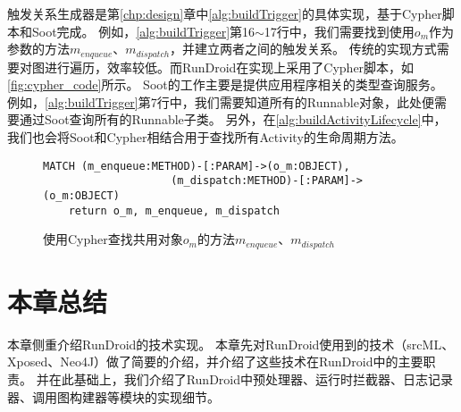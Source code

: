 触发关系生成器是第\ref{chp:design}章中\autoref{alg:buildTrigger}的具体实现，基于Cypher脚本和Soot完成。
例如，\autoref{alg:buildTrigger}第16$\sim$17行中，我们需要找到使用$o_{m}$作为参数的方法$m_{enqueue}$、$m_{dispatch}$，并建立两者之间的触发关系。
传统的实现方式需要对图进行遍历，效率较低。而RunDroid在实现上采用了Cypher脚本，如\autoref{fig:cypher_code}所示。
Soot的工作主要是提供应用程序相关的类型查询服务。
例如，\autoref{alg:buildTrigger}第7行中，我们需要知道所有的Runnable对象，此处便需要通过Soot查询所有的Runnable子类。
另外，在\ref{alg:buildActivityLifecycle}中，我们也会将Soot和Cypher相结合用于查找所有Activity的生命周期方法。

\begin{figure}[!h]
	\centering
	\begin{lstlisting}[style=normal,language=cypher]
	MATCH (m_enqueue:METHOD)-[:PARAM]->(o_m:OBJECT),
					(m_dispatch:METHOD)-[:PARAM]->(o_m:OBJECT)
	return o_m, m_enqueue, m_dispatch\end{lstlisting}
	\caption{使用Cypher查找共用对象$o_m$的方法$m_{enqueue}$、$m_{dispatch}$}
	\label{fig:cypher_code}
\end{figure}


 \section{本章总结}

本章侧重介绍RunDroid的技术实现。
本章先对RunDroid使用到的技术（srcML、Xposed、Neo4J）做了简要的介绍，并介绍了这些技术在RunDroid中的主要职责。
并在此基础上，我们介绍了RunDroid中预处理器、运行时拦截器、日志记录器、调用图构建器等模块的实现细节。
